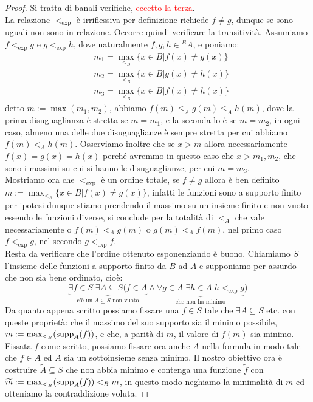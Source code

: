 \begin{proof}
	Si tratta di banali verifiche, \textcolor{red}{eccetto la terza}.\\
	La relazione $<_{\exp}$ è irriflessiva per definizione richiede $f \ne g$, dunque se sono uguali non sono in relazione. Occorre quindi verificare la transitività.
	Assumiamo $f <_{\exp} g$ e $g <_{\exp} h$, dove naturalmente $f,g,h \in {}^B A$, e poniamo:
	\begin{align*}
		&m_1 = \max_{<_B}\{x\in B | f(x) \ne g(x)\} \\
		&m_2 = \max_{<_B}\{x\in B | g(x) \ne h(x)\} \\
		&m_3 = \max_{<_B}\{x\in B | f(x) \ne h(x)\}
	\end{align*}
	detto $m := \max(m_1,m_2)$, abbiamo $f(m) \leq_A g(m) \leq_A h(m)$, dove la prima disuguaglianza è stretta se $m = m_1$, e la seconda lo è se $m = m_2$, in ogni caso, almeno una delle due disuguaglianze è sempre stretta per cui abbiamo $f(m) <_A h(m)$.
	Osserviamo inoltre che se $x > m$ allora necessariamente $f(x) = g(x) = h(x)$ perché avremmo in questo caso che $x > m_1,m_2$, che sono i massimi su cui si hanno le disuguaglianze, per cui $m = m_3$.\\
	Mostriamo ora che $<_{\exp}$ è un ordine totale, se $f \ne g$ allora è ben definito $m := \max_{<_B}\{x \in B | f(x) \ne g(x)\}$, infatti le funzioni sono a supporto finito per ipotesi dunque stiamo prendendo il massimo su un insieme finito e 
	non vuoto essendo le funzioni diverse, si conclude per la totalità di $<_A$ che vale necessariamente o $f(m)<_A g(m)$ o $g(m) <_A f(m)$, nel primo caso $f <_{\exp} g$, nel secondo $g <_{\exp} f$.\\
	Resta da verificare che l'ordine ottenuto esponenziando è buono. Chiamiamo $S$ l'insieme delle funzioni a supporto finito da $B$ ad $A$ e supponiamo per assurdo che non sia bene ordinato, cioè:
	\[ \underbrace{\exists f \in S \; \exists A \subseteq S (f \in A}_{\text{c'è un $A \subseteq S$ non vuoto}}\land\underbrace{\forall g \in A \; \exists h \in A \; h <_{\exp} g}_{\text{che non ha minimo}})
		\]
	Da quanto appena scritto possiamo fissare una $f \in S$ tale che $\exists A \subseteq S$ etc. con queste proprietà:
	che il massimo del suo supporto sia il minimo possibile, $m:=\max_{<_B}(\operatorname{supp}_A(f))$, e che, a parità di $m$, il valore di $f(m)$ sia minimo.
	Fissata $f$ come scritto, possiamo fissare ora anche $A$ nella formula in modo tale che $f \in A$ ed $A$ sia un sottoinsieme senza minimo.
	Il nostro obiettivo ora è costruire $\widetilde{A} \subseteq S$ che non abbia minimo e contenga una funzione $\widetilde{f}$ con $\widetilde{m} := \max_{<_B}(\operatorname{supp}_A(f)) <_B m$, in questo modo neghiamo la minimalità di $m$ ed otteniamo la contraddizione voluta.

\end{proof}
